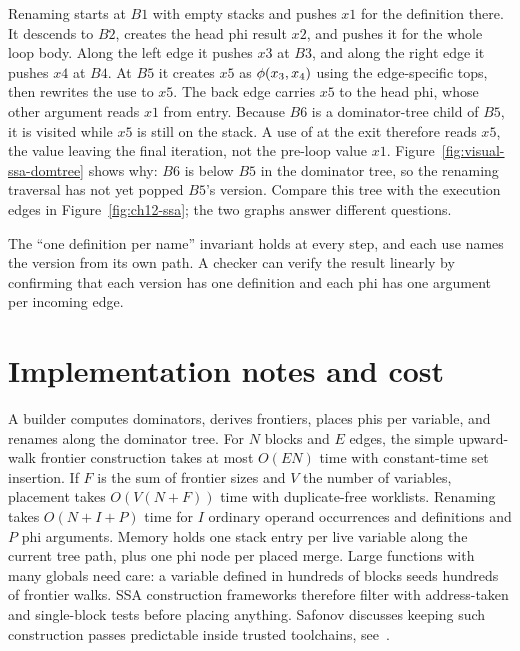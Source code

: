 Renaming starts at $B1$ with empty stacks and pushes $x1$ for the definition there.
It descends to $B2$, creates the head phi result $x2$, and pushes it for the whole loop body.
Along the left edge it pushes $x3$ at $B3$, and along the right edge it pushes $x4$ at $B4$.
At $B5$ it creates $x5$ as $\phi(x_3, x_4)$ using the edge-specific tops, then rewrites the use to $x5$.
The back edge carries $x5$ to the head phi, whose other argument reads $x1$ from entry.
Because $B6$ is a dominator-tree child of $B5$, it is visited while $x5$ is still on the stack.
A use of  at the exit therefore reads $x5$, the value leaving the final iteration, not the pre-loop value $x1$.
Figure~\ref{fig:visual-ssa-domtree} shows why: $B6$ is below $B5$ in the dominator tree, so the renaming traversal has not yet popped $B5$'s version.
Compare this tree with the execution edges in Figure~\ref{fig:ch12-ssa}; the two graphs answer different questions.



The \enquote{one definition per name} invariant holds at every step, and each use names the version from its own path.
A checker can verify the result linearly by confirming that each version has one definition and each phi has one argument per incoming edge.

\section{Implementation notes and cost}
\label{sec:ch12-implementation}

A builder computes dominators, derives frontiers, places phis per variable, and renames along the dominator tree.
For $N$ blocks and $E$ edges, the simple upward-walk frontier construction takes at most $O(EN)$ time with constant-time set insertion.
If $F$ is the sum of frontier sizes and $V$ the number of variables, placement takes $O(V(N+F))$ time with duplicate-free worklists.
Renaming takes $O(N+I+P)$ time for $I$ ordinary operand occurrences and definitions and $P$ phi arguments.
Memory holds one stack entry per live variable along the current tree path, plus one phi node per placed merge.
Large functions with many globals need care: a variable defined in hundreds of blocks seeds hundreds of frontier walks.
SSA construction frameworks therefore filter with address-taken and single-block tests before placing anything.
Safonov discusses keeping such construction passes predictable inside trusted toolchains, see~\cite{safonov-2010-trustworthy}.

